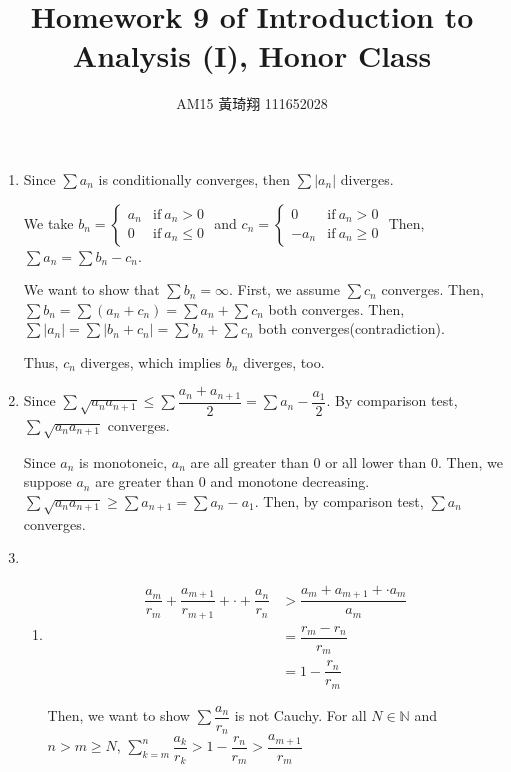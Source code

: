 \documentclass[12pt]{article}
\title{Homework 9 of Introduction to Analysis (I), Honor Class}
\author{AM15 黃琦翔 111652028}
\begin{document}
\maketitle
\begin{enumerate}
    \item Since $\sum a_n$ is conditionally converges, then $\sum |a_n|$ diverges.
    
    We take $b_n = \left\lbrace\begin{matrix}
        a_n & \text{if}\ a_n > 0\\
        0 & \text{if}\ a_n \leq 0
    \end{matrix}\right.$ 
    and $c_n = \left\lbrace\begin{matrix}
        0 & \text{if}\ a_n > 0\\
        - a_n & \text{if}\ a_n \geq 0
    \end{matrix}\right.$
    Then, $\sum a_n = \sum b_n - c_n$.

    We want to show that $\sum b_n = \infty$. First, we assume $\sum c_n$ converges.
    Then, $\sum b_n = \sum (a_n + c_n) = \sum a_n + \sum c_n$ both converges.
    Then, $\sum |a_n| = \sum |b_n + c_n| = \sum b_n + \sum c_n$ both converges(contradiction).

    Thus, $c_n$ diverges, which implies $b_n$ diverges, too.

    \item Since $\sum \sqrt{a_n a_{n+1}} \leq \sum \dfrac{a_n + a_{n+1}}{2} = \sum a_n - \dfrac{a_1}{2}$.
    By comparison test, $\sum \sqrt{a_n a_{n+1}}$ converges.

    Since $a_n$ is monotoneic, $a_n$ are all greater than $0$ or all lower than $0$.
    Then, we suppose $a_n$ are greater than $0$ and monotone decreasing.
    $\sum \sqrt{a_n a_{n+1}} \geq \sum a_{n+1} = \sum a_n - a_1$.
    Then, by comparison test, $\sum a_n$ converges.

    \item \begin{enumerate}
        \item \begin{align*}
            \dfrac{a_m}{r_m} + \dfrac{a_{m+1}}{r_{m+1}} + \cdot + \dfrac{a_n}{r_n} &> \dfrac{a_m + a_{m+1} + \cdot a_m}{a_m}\\
            &= \dfrac{r_m - r_n}{r_m}\\
            &= 1 - \dfrac{r_n}{r_m}
        \end{align*}

        Then, we want to show $\sum \dfrac{a_n}{r_n}$ is not Cauchy.
        For all $N\in \mathbb{N}$ and $n > m \geq N$,
        $\displaystyle\sum_{k=m}^{n} \dfrac{a_k}{r_k} > 1- \dfrac{r_n}{r_m} > \dfrac{a_{m+1}}{r_m}$



\end{enumerate}
\end{enumerate}
\end{document}
